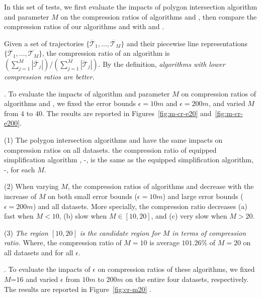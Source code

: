 In this set of tests, we first evaluate the impacts of polygon intersection algorithm \rpia and parameter $M$ on the compression ratios of algorithms \cist and \cista, then compare the compression ratios of our algorithms \cist and \cista with \dps and \squishe.

Given a set of trajectories $\{\dddot{\mathcal{T}_1}, \ldots, \dddot{\mathcal{T}_M}\}$ and their piecewise line representations $\{\overline{\mathcal{T}_1}, \ldots, \overline{\mathcal{T}_M}\}$, the compression ratio of an algorithm is $(\sum_{j=1}^{M} |\overline{\mathcal{T}}_j |)/(\sum_{j=1}^{M} |\dddot{\mathcal{T}}_j |)$.
By the definition, \emph{algorithms with lower compression ratios are better}.




.
To evaluate the impacts of algorithm \rpia and parameter $M$ on compression ratios of algorithms \cist and \cista, we fixed the error bounds {$\epsilon =10m$} and $\epsilon =200m$, and varied $M$ from $4$ to $40$.
The results are reported in Figures~\ref{fig:m-cr-e20} and~\ref{fig:m-cr-e200}.


\ni(1) The polygon intersection algorithms \rpia and \cpia have the same impacts on compression ratios on all datasets. \eg the compression ratio of \rpia equipped simplification algorithm \cist, \ie \cist-\rpia, is the same as the \cpia equipped simplification algorithm, \ie \cist-\cpia, for each $M$.


\ni(2) When varying $M$, the compression ratios of algorithms \cist and \cista decrease with the increase of $M$ on both small error bounds {(\eg $\epsilon = 10m$)} and large error bounds (\eg $\epsilon = 200m$) and all datasets.
More specially, the compression ratio decreases (a) fast when $M < 10$, (b) slow when $M \in [10, 20]$, and (c) very slow when $M  > 20$.


\ni(3) \emph{The region $[10, 20]$ is the candidate region for $M$ in terms of compression ratio.}
Where, the compression ratio of $M=10$ is average {$101.26\%$} of $M=20$ on all datasets and for all $\epsilon$.


.
To evaluate the impacts of $\epsilon$ on compression ratios of these algorithms, we fixed \textcolor[rgb]{0.00,0.07,1.00}{$M$=$16$} and varied $\epsilon$ from $10m$ to $200m$ on the entire four datasets, respectively.
The results are reported in Figure~\ref{fig:cr-m20} .


